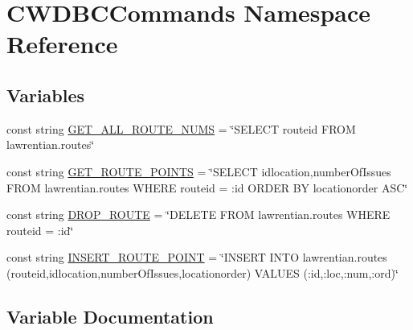 \hypertarget{namespace_c_w_d_b_c_commands}{}\section{C\+W\+D\+B\+C\+Commands Namespace Reference}
\label{namespace_c_w_d_b_c_commands}
\subsection*{Variables}
\begin{DoxyCompactItemize}
\item 
const string \hyperlink{namespace_c_w_d_b_c_commands_aab733307e09eeb9654b58812c08502fe}{G\+E\+T\+\_\+\+A\+L\+L\+\_\+\+R\+O\+U\+T\+E\+\_\+\+N\+U\+M\+S} = \char`\"{}S\+E\+L\+E\+C\+T routeid F\+R\+O\+M lawrentian.\+routes\char`\"{}
\item 
const string \hyperlink{namespace_c_w_d_b_c_commands_aa05e830c98222ee12267852ebcb5d48c}{G\+E\+T\+\_\+\+R\+O\+U\+T\+E\+\_\+\+P\+O\+I\+N\+T\+S} = \char`\"{}S\+E\+L\+E\+C\+T idlocation,number\+Of\+Issues F\+R\+O\+M lawrentian.\+routes W\+H\+E\+R\+E routeid = \+:id O\+R\+D\+E\+R B\+Y locationorder A\+S\+C\char`\"{}
\item 
const string \hyperlink{namespace_c_w_d_b_c_commands_a3f1afd7c1c975fe20818bcaac5411782}{D\+R\+O\+P\+\_\+\+R\+O\+U\+T\+E} = \char`\"{}D\+E\+L\+E\+T\+E F\+R\+O\+M lawrentian.\+routes W\+H\+E\+R\+E routeid = \+:id\char`\"{}
\item 
const string \hyperlink{namespace_c_w_d_b_c_commands_abd88284f4660e14a8b6397613a162bce}{I\+N\+S\+E\+R\+T\+\_\+\+R\+O\+U\+T\+E\+\_\+\+P\+O\+I\+N\+T} = \char`\"{}I\+N\+S\+E\+R\+T I\+N\+T\+O lawrentian.\+routes (routeid,idlocation,number\+Of\+Issues,locationorder) V\+A\+L\+U\+E\+S (\+:id,\+:loc,\+:num,\+:ord)\char`\"{}
\end{DoxyCompactItemize}


\subsection{Variable Documentation}
\hypertarget{namespace_c_w_d_b_c_commands_a3f1afd7c1c975fe20818bcaac5411782}{}

